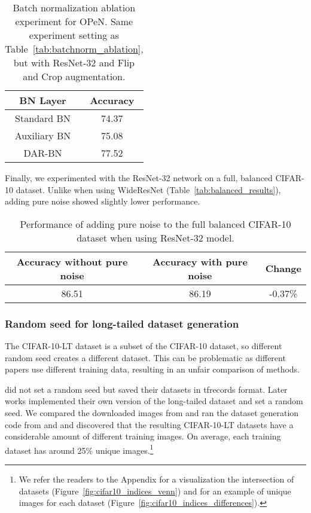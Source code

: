 \begin{table}[!ht]
    \centering
    \begin{tabular}{c|c}
        BN Layer & Accuracy \\
        \hline
        Standard BN \citep{BatchNorm} & 74.37 \\
        Auxiliary BN \citep{AuxBN} & 75.08 \\
        DAR-BN \citep{PureNoise} & 77.52 \\
    \end{tabular}
    \caption{Batch normalization ablation experiment for OPeN. Same experiment setting as Table~\ref{tab:batchnorm_ablation}, but with ResNet-32 and Flip and Crop augmentation.}
    \label{tab:resnet_batchnorm_ablation}
\end{table}

Finally, we experimented with the ResNet-32 network on a full, balanced CIFAR-10 dataset. Unlike when using WideResNet (Table~\ref{tab:balanced_results}), adding pure noise showed slightly lower performance.

\begin{table}[!ht]
    \centering
    \begin{tabular}{c|c|c}
        Accuracy without pure noise & Accuracy with pure noise & Change \\ \hline
        86.51 & 86.19 & -0.37\% \\
    \end{tabular}
    \caption{Performance of adding pure noise to the full balanced CIFAR-10 dataset when using ResNet-32 model.}
    \label{tab:balanced_results_resnet32}
\end{table}


\subsubsection{Random seed for long-tailed dataset generation}
\label{sec:dataset_random_seed}

The CIFAR-10-LT dataset is a subset of the CIFAR-10 dataset, so different random seed creates a different dataset. This can be problematic as different papers use different training data, resulting in an unfair comparison of methods.

\citet{ClassBalancedLoss} did not set a random seed but saved their datasets in tfrecords format. Later works implemented their own version of the long-tailed dataset and set a random seed. We compared the downloaded images from \citet{ClassBalancedLoss} and ran the dataset generation code from \citet{LDAM-DRW} and \citet{M2m} and discovered that the resulting CIFAR-10-LT datasets have a considerable amount of different training images. On average, each training dataset has around 25\% unique images.\footnote{We refer the readers to the Appendix for a visualization the intersection of datasets (Figure~\ref{fig:cifar10_indices_venn}) and for an example of unique images for each dataset (Figure~\ref{fig:cifar10_indices_differences}).}

